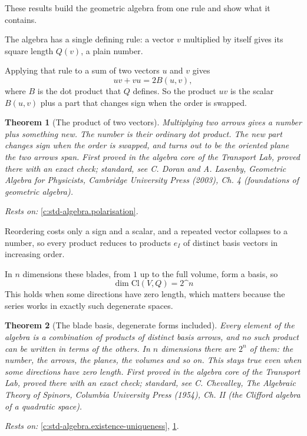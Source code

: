 \documentclass[11pt]{article}
\newtheorem{theorem}{Theorem}[section]
\theoremstyle{definition}
\theoremstyle{plain}
\providecommand{\Cl}{}\renewcommand{\Cl}{\mathrm{Cl}}
\begin{document}
These results build the geometric algebra from one rule and show what it contains.

The algebra has a single defining rule: a vector $v$ multiplied by itself gives its square length $Q(v)$, a plain number.

Applying that rule to a sum of two vectors $u$ and $v$ gives \[ uv + vu = 2B(u, v), \] where $B$ is the dot product that $Q$ defines. So the product $uv$ is the scalar $B(u, v)$ plus a part that changes sign when the order is swapped.

\begin{theorem}[The product of two vectors]\label{c:std-algebra.vector-squares}
Multiplying two arrows gives a number plus something new. The number is their ordinary dot product. The new part changes sign when the order is swapped, and turns out to be the oriented plane the two arrows span.
\emph{First proved in} the algebra core of the Transport Lab, proved there with an exact check; standard, see C. Doran and A. Lasenby, Geometric Algebra for Physicists, Cambridge University Press (2003), Ch. 4 (foundations of geometric algebra).
\end{theorem}
\noindent\emph{Rests on:} \ref{c:std-algebra.polarisation}.

Reordering costs only a sign and a scalar, and a repeated vector collapses to a number, so every product reduces to products $e_I$ of distinct basis vectors in increasing order.

In $n$ dimensions these blades, from $1$ up to the full volume, form a basis, so \[ \dim \Cl(V, Q) = 2\^{}{n} \] This holds when some directions have zero length, which matters because the series works in exactly such degenerate spaces.

\begin{theorem}[The blade basis, degenerate forms included]\label{c:std-algebra.blade-basis}
Every element of the algebra is a combination of products of distinct basis arrows, and no such product can be written in terms of the others. In $n$ dimensions there are $2^{n}$ of them: the number, the arrows, the planes, the volumes and so on. This stays true even when some directions have zero length.
\emph{First proved in} the algebra core of the Transport Lab, proved there with an exact check; standard, see C. Chevalley, The Algebraic Theory of Spinors, Columbia University Press (1954), Ch. II (the Clifford algebra of a quadratic space).
\end{theorem}
\noindent\emph{Rests on:} \ref{c:std-algebra.existence-uniqueness}, \ref{c:std-algebra.vector-squares}.
\end{document}
